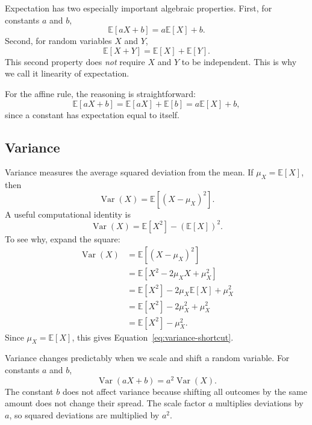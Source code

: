 {Expectation has two especially important algebraic properties.  First, for constants $a$ and $b$,
\begin{equation}
  \mathbb{E}[aX+b] = a\mathbb{E}[X]+b.
  \label{eq:affine-expectation}
\end{equation}
Second, for random variables $X$ and $Y$,
\begin{equation}
  \mathbb{E}[X+Y] = \mathbb{E}[X] + \mathbb{E}[Y].
  \label{eq:linearity-expectation}
\end{equation}
This second property does \emph{not} require $X$ and $Y$ to be independent.  This is why we call it linearity of expectation.

For the affine rule, the reasoning is straightforward:
\[
  \mathbb{E}[aX+b]
  = \mathbb{E}[aX] + \mathbb{E}[b]
  = a\mathbb{E}[X] + b,
\]
since a constant has expectation equal to itself.

\subsection{Variance}

Variance measures the average squared deviation from the mean.  If $\mu_X = \mathbb{E}[X]$, then
\begin{equation}
  \operatorname{Var}(X)=\mathbb{E}\left[(X-\mu_X)^2\right].
  \label{eq:variance-definition}
\end{equation}
A useful computational identity is
\begin{equation}
  \operatorname{Var}(X)=\mathbb{E}[X^2]-\left(\mathbb{E}[X]\right)^2.
  \label{eq:variance-shortcut}
\end{equation}
To see why, expand the square:
\begin{align*}
  \operatorname{Var}(X)
  &= \mathbb{E}\left[(X-\mu_X)^2\right] \\
  &= \mathbb{E}\left[X^2 - 2\mu_X X + \mu_X^2\right] \\
  &= \mathbb{E}[X^2] - 2\mu_X\mathbb{E}[X] + \mu_X^2 \\
  &= \mathbb{E}[X^2] - 2\mu_X^2 + \mu_X^2 \\
  &= \mathbb{E}[X^2] - \mu_X^2.
\end{align*}
Since $\mu_X=\mathbb{E}[X]$, this gives Equation~\eqref{eq:variance-shortcut}.

Variance changes predictably when we scale and shift a random variable.  For constants $a$ and $b$,
\begin{equation}
  \operatorname{Var}(aX+b)=a^2\operatorname{Var}(X).
  \label{eq:variance-affine}
\end{equation}
The constant $b$ does not affect variance because shifting all outcomes by the same amount does not change their spread.  The scale factor $a$ multiplies deviations by $a$, so squared deviations are multiplied by $a^2$.

}
